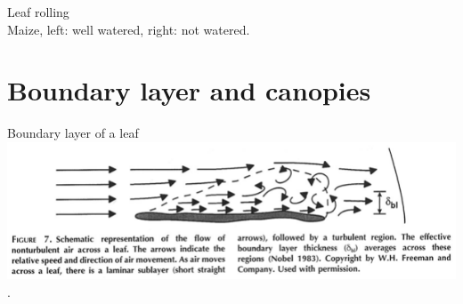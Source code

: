 \documentclass[10pt]{beamer}
\begin{document}
\begin{frame}{Leaf rolling}
    \\
    Maize, left: well watered, right: not watered.
\end{frame}

\section{Boundary layer and canopies}

\begin{frame}{Boundary layer of a leaf}
    \centering\includegraphics[width=\textwidth]{figures/Lambers7BoundaryLayer}\\
    {\small \autocite[from][]{LambersEtAl1998}.}
\end{frame}
\end{document}
